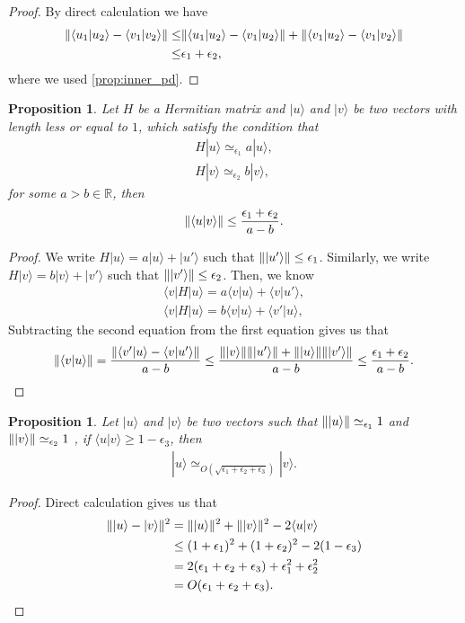 \documentclass[11pt,letterpaper]{article}
\newcommand{\ket}[1]{|#1\rangle}
\newcommand{\bra}[1]{\langle#1|}
\newcommand{\braket}[2]{\langle#1|#2\rangle}
\DeclarePairedDelimiter{\norm}{\lVert}{\rVert}
\newcommand{\R}{\mathbb{R}}
\newcommand{\1}{\mathbb{1}}
\newcommand{\ep}{\epsilon}
\newcommand{\appd}[1]{\simeq_{#1}}
\newtheorem{proposition}[theorem]{Proposition}
\theoremstyle{definition}
\begin{document}
\begin{proof}
	By direct calculation we have
	\begin{align}
		\norm{ \braket{u_1}{u_2} - \braket{v_1}{v_2}} \leq &\norm{\braket{u_1}{u_2} - \braket{v_1}{u_2}}
		+ \norm{\braket{v_1}{u_2} - \braket{v_1}{v_2}} \\
		\leq & \ep_1 + \ep_2,
	\end{align}
	where we used \cref{prop:inner_pd}.
\end{proof}
\begin{proposition}
\label{prop:orthog}
	Let $H$ be a Hermitian matrix and $\ket{u}$ and $\ket{v}$ be two vectors with length less or equal to $1$,
	which satisfy the condition that 
	\begin{align}
		H\ket{u} \appd{\ep_1} a \ket{u}, \\
		H\ket{v} \appd{\ep_2} b \ket{v}, 
	\end{align}
	for some $a > b \in \R$, then
	\begin{align}
		\norm{\braket{u}{v}} \leq \frac{\ep_1+\ep_2}{a-b}.
	\end{align}
\end{proposition}
\begin{proof}
	We write $H\ket{u} = a\ket{u} + \ket{u'}$ such that $\norm{\ket{u'}} \leq \ep_1$.
	Similarly, we write $H\ket{v} = b\ket{v} + \ket{v'}$ such that $\norm{\ket{v'}} \leq \ep_2$.
	Then, we know
	\begin{align}
		\bra{v}H\ket{u} = a\braket{v}{u} + \braket{v}{u'},\\
		\bra{v}H\ket{u}  =b\braket{v}{u} + \braket{v'}{u},
	\end{align}
	Subtracting the second equation from the first equation gives us that 
	\begin{align}
		\norm{\braket{v}{u}} = \frac{\norm{\braket{v'}{u} -  \braket{v}{u'}}}{a-b} \leq \frac{\norm{\ket{v}}\norm{\ket{u'}}+
		\norm{\ket{u}}\norm{\ket{v'}}}{a-b} 
		\leq \frac{\ep_1+\ep_2}{a-b}.
	\end{align}
\end{proof}
\begin{proposition}
\label{prop:close_vec}
	Let $\ket{u}$ and $\ket{v}$ be two vectors such that $\norm{\ket{u}} \appd{\ep_1} 1$ and
	$\norm{\ket{v}} \appd{\ep_2} 1$ , if $\braket{u}{v} \geq 1 - \ep_3$,
	then
	\begin{align}
		\ket{u} \appd{O(\sqrt{\ep_1+\ep_2+\ep_3})} \ket{v}.
	\end{align}
\end{proposition}
\begin{proof}
	Direct calculation gives us that
	\begin{align}
		\norm{\ket{u} - \ket{v}}^2 &= \norm{\ket{u}}^2 + \norm{\ket{v}}^2 - 2\braket{u}{v} \\
		&\leq (1+\ep_1)^2 + (1+\ep_2)^2 - 2(1 - \ep_3)\\
		&= 2(\ep_1+\ep_2+\ep_3)+ \ep_1^2 + \ep_2^2\\
		& = O(\ep_1+\ep_2+\ep_3).
	\end{align}
\end{proof}
\end{document}

